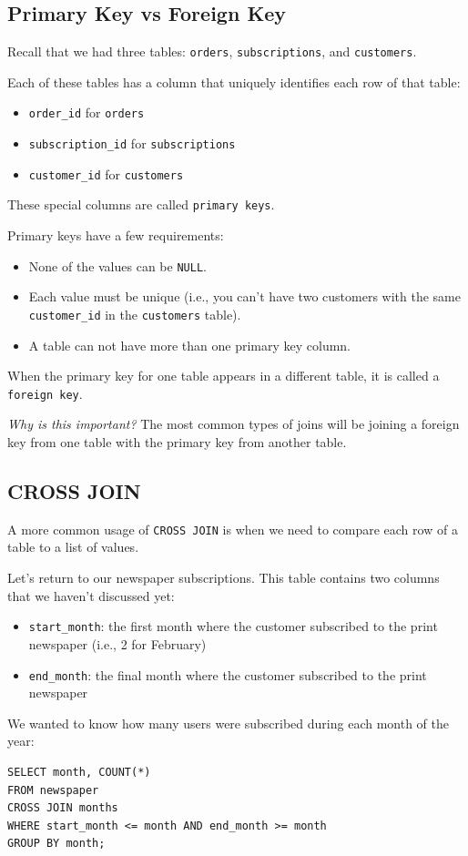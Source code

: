 \documentclass[a4paper, 12pt]{article}
\begin{document}
\subsection{Primary Key vs Foreign Key}
Recall that we had three tables: \verb|orders|, \verb|subscriptions|, and \verb|customers|.

Each of these tables has a column that uniquely identifies each row of that table:
\begin{itemize}
\item \verb|order_id| for \verb|orders|

\item \verb|subscription_id| for \verb|subscriptions|

\item \verb|customer_id| for \verb|customers|

\end{itemize}
These special columns are called \verb|primary keys|.

Primary keys have a few requirements:
\begin{itemize}
\item None of the values can be \verb|NULL|.

\item Each value must be unique (i.e., you can't have two customers with the same \verb|customer_id| in the \verb|customers| table).

\item A table can not have more than one primary key column.

\end{itemize}

When the primary key for one table appears in a different table, it is called a \verb|foreign key|.

\textit{Why is this important?} The most common types of joins will be joining a foreign key from one table with the primary key from another table.

\subsection{CROSS JOIN}
A more common usage of \verb|CROSS JOIN| is when we need to compare each row of a table to a list of values.

Let's return to our newspaper subscriptions. This table contains two columns that we haven't discussed yet:
\begin{itemize}
\item \verb|start_month|: the first month where the customer subscribed to the print newspaper (i.e., 2 for February)

\item \verb|end_month|: the final month where the customer subscribed to the print newspaper

\end{itemize}
We wanted to know how many users were subscribed during each month of the year:
\begin{verbatim}
SELECT month, COUNT(*)
FROM newspaper
CROSS JOIN months
WHERE start_month <= month AND end_month >= month
GROUP BY month;
\end{verbatim}
\end{document}
